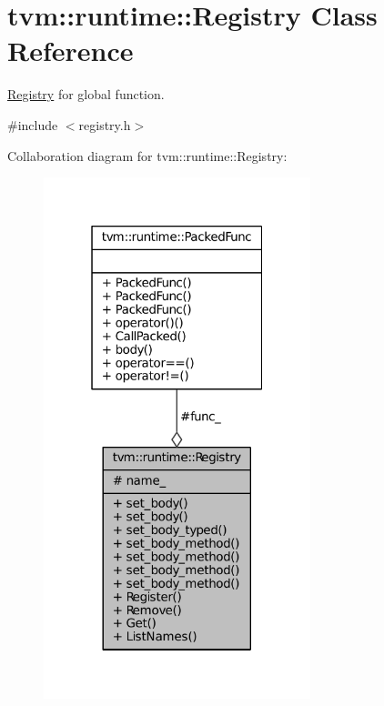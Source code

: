 \hypertarget{classtvm_1_1runtime_1_1Registry}{}\section{tvm\+:\+:runtime\+:\+:Registry Class Reference}
\label{classtvm_1_1runtime_1_1Registry}


\hyperlink{classtvm_1_1runtime_1_1Registry}{Registry} for global function.  




{\ttfamily \#include $<$registry.\+h$>$}



Collaboration diagram for tvm\+:\+:runtime\+:\+:Registry\+:
\nopagebreak
\begin{figure}[H]
\begin{center}
\leavevmode
\includegraphics[width=220pt]{classtvm_1_1runtime_1_1Registry__coll__graph}
\end{center}
\end{figure}
